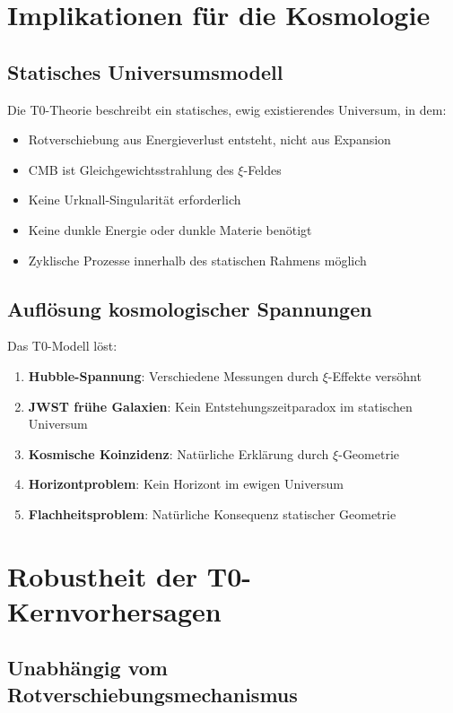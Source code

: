 \documentclass[12pt,a4paper]{article}
\theoremstyle{definition}
\begin{document}
	\section{Implikationen f\"ur die Kosmologie}
	
	\subsection{Statisches Universumsmodell}
	
	Die T0-Theorie beschreibt ein statisches, ewig existierendes Universum, in dem:
	\begin{itemize}
		\item Rotverschiebung aus Energieverlust entsteht, nicht aus Expansion
		\item CMB ist Gleichgewichtsstrahlung des $\xi$-Feldes
		\item Keine Urknall-Singularit\"at erforderlich
		\item Keine dunkle Energie oder dunkle Materie ben\"otigt
		\item Zyklische Prozesse innerhalb des statischen Rahmens m\"oglich
	\end{itemize}
	
	\subsection{Aufl\"osung kosmologischer Spannungen}
	
	Das T0-Modell l\"ost:
	\begin{enumerate}
		\item \textbf{Hubble-Spannung}: Verschiedene Messungen durch $\xi$-Effekte vers\"ohnt
		\item \textbf{JWST fr\"uhe Galaxien}: Kein Entstehungszeitparadox im statischen Universum
		\item \textbf{Kosmische Koinzidenz}: Nat\"urliche Erkl\"arung durch $\xi$-Geometrie
		\item \textbf{Horizontproblem}: Kein Horizont im ewigen Universum
		\item \textbf{Flachheitsproblem}: Nat\"urliche Konsequenz statischer Geometrie
	\end{enumerate}
	
	\section{Robustheit der T0-Kernvorhersagen}
	
	\subsection{Unabh\"angig vom Rotverschiebungsmechanismus}
	
\end{document}
